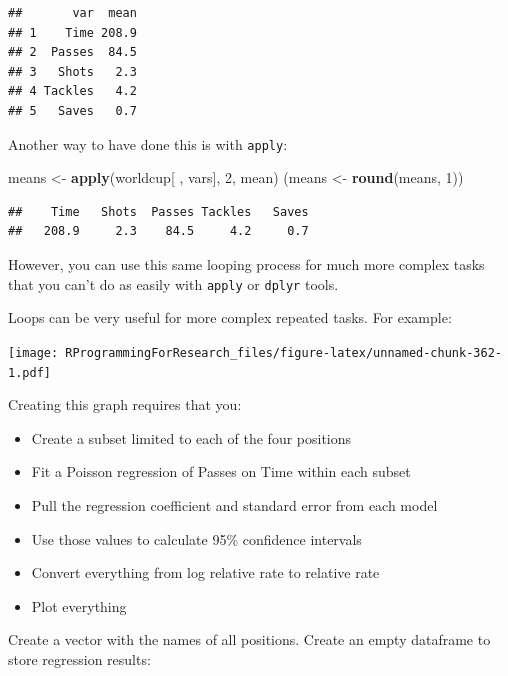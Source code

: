 \documentclass[]{book}
\makeatletter
\newenvironment{Shaded}{\begin{snugshade}}{\end{snugshade}}
\newcommand{\KeywordTok}[1]{\textcolor[rgb]{0.13,0.29,0.53}{\textbf{#1}}}
\newcommand{\DecValTok}[1]{\textcolor[rgb]{0.00,0.00,0.81}{#1}}
\newcommand{\StringTok}[1]{\textcolor[rgb]{0.31,0.60,0.02}{#1}}
\newcommand{\OperatorTok}[1]{\textcolor[rgb]{0.81,0.36,0.00}{\textbf{#1}}}
\newcommand{\NormalTok}[1]{#1}
\providecommand{\tightlist}{%
  \setlength{\itemsep}{0pt}\setlength{\parskip}{0pt}}
\newenvironment{kframe}{%
\medskip{}
\setlength{\fboxsep}{.8em}
 \def\at@end@of@kframe{}%
 \ifinner\ifhmode%
  \def\at@end@of@kframe{\end{minipage}}%
  \begin{minipage}{\columnwidth}%
 \fi\fi%
 \def\FrameCommand##1{\hskip\@totalleftmargin \hskip-\fboxsep
 \colorbox{shadecolor}{##1}\hskip-\fboxsep
     \hskip-\linewidth \hskip-\@totalleftmargin \hskip\columnwidth}%
 \MakeFramed {\advance\hsize-\width
   \@totalleftmargin\z@ \linewidth\hsize
   \@setminipage}}%
 {\par\unskip\endMakeFramed%
 \at@end@of@kframe}
\renewenvironment{Shaded}{\begin{kframe}}{\end{kframe}}
\theoremstyle{definition}
\theoremstyle{definition}
\theoremstyle{definition}
\theoremstyle{remark}
\makeatother
\begin{document}
\begin{verbatim}
##       var  mean
## 1    Time 208.9
## 2  Passes  84.5
## 3   Shots   2.3
## 4 Tackles   4.2
## 5   Saves   0.7
\end{verbatim}

Another way to have done this is with \texttt{apply}:

\begin{Shaded}
\begin{Highlighting}[]
\NormalTok{means <-}\StringTok{ }\KeywordTok{apply}\NormalTok{(worldcup[ , vars], }\DecValTok{2}\NormalTok{, mean)}
\NormalTok{(means <-}\StringTok{ }\KeywordTok{round}\NormalTok{(means, }\DecValTok{1}\NormalTok{))}
\end{Highlighting}
\end{Shaded}

\begin{verbatim}
##    Time   Shots  Passes Tackles   Saves 
##   208.9     2.3    84.5     4.2     0.7
\end{verbatim}

However, you can use this same looping process for much more complex
tasks that you can't do as easily with \texttt{apply} or \texttt{dplyr}
tools.

Loops can be very useful for more complex repeated tasks. For example:

\texttt{[image: RProgrammingForResearch\_files/figure-latex/unnamed-chunk-362-1.pdf]}

Creating this graph requires that you:

\begin{itemize}
\tightlist
\item
  Create a subset limited to each of the four positions
\item
  Fit a Poisson regression of Passes on Time within each subset
\item
  Pull the regression coefficient and standard error from each model
\item
  Use those values to calculate 95\% confidence intervals
\item
  Convert everything from log relative rate to relative rate
\item
  Plot everything
\end{itemize}

Create a vector with the names of all positions. Create an empty
dataframe to store regression results:

\begin{Shaded}
\end{Shaded}
\end{document}
